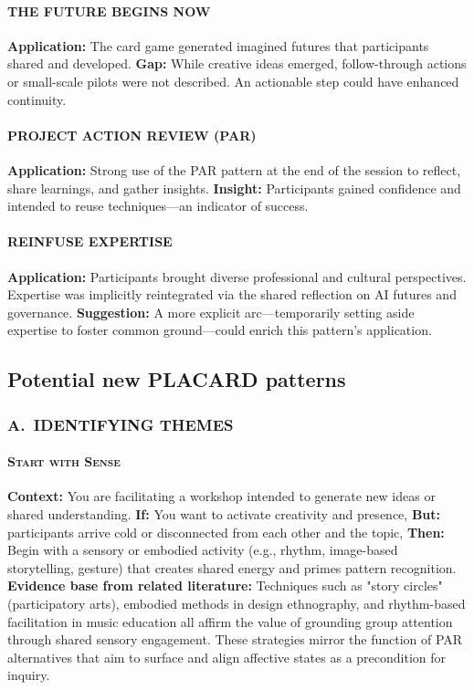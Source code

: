 \documentclass[acmlarge,timestamp]{acmart}
\begin{document}
{\paragraph*{THE FUTURE BEGINS NOW}

\noindent \textbf{Application:} The card game generated imagined futures that participants shared and developed. \textbf{Gap:} While creative ideas emerged, follow-through actions or small-scale pilots were not described. An actionable step could have enhanced continuity.

\paragraph*{PROJECT ACTION REVIEW (PAR)}

\noindent \textbf{Application:} Strong use of the PAR pattern at the end of the session to reflect, share learnings, and gather insights. \textbf{Insight:} Participants gained confidence and intended to reuse techniques—an indicator of success.

\paragraph*{REINFUSE EXPERTISE}

\noindent \textbf{Application:} Participants brought diverse professional and cultural perspectives. Expertise was implicitly reintegrated via the shared reflection on AI futures and governance. \textbf{Suggestion:} A more explicit arc—temporarily setting aside expertise to foster common ground—could enrich this pattern’s application.

\subsection*{Potential new PLACARD patterns}

\subsubsection*{A.~IDENTIFYING THEMES}

\paragraph*{{\scshape Start with Sense}}

\noindent\textbf{Context:} You are facilitating a workshop intended to generate new ideas or shared understanding.
\textbf{If:} You want to activate creativity and presence,  \textbf{But:} participants arrive cold or disconnected from each other and the topic,
\textbf{Then:} Begin with a sensory or embodied activity (e.g., rhythm, image-based storytelling, gesture) that creates shared energy and primes pattern recognition.
\textbf{Evidence base from related literature:} Techniques such as "story circles" (participatory arts), embodied methods in design ethnography, and rhythm-based facilitation in music education all affirm the value of grounding group attention through shared sensory engagement. These strategies mirror the function of PAR alternatives that aim to surface and align affective states as a precondition for inquiry.

}
\end{document}
